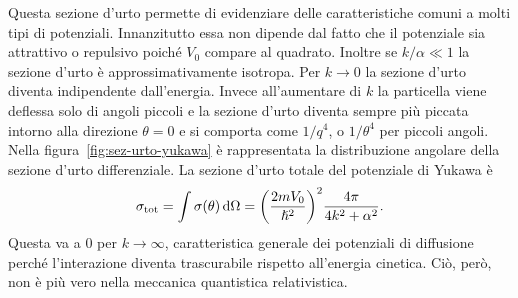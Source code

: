 \documentclass[a4paper,fleqn,twoside,12pt]{article}
\newcommand*{\dd}{\mathop{}\!\mathrm{d}} %
\begin{document}
Questa sezione d'urto permette di evidenziare delle caratteristiche comuni a
molti tipi di potenziali.  Innanzitutto essa non dipende dal fatto che il
potenziale sia attrattivo o repulsivo poiché $V_{0}$ compare al quadrato.
Inoltre se $k/\alpha \ll 1$ la sezione d'urto è approssimativamente isotropa.
Per $k \to 0$ la sezione d'urto diventa indipendente dall'energia.  Invece
all'aumentare di $k$ la particella viene deflessa solo di angoli piccoli e la
sezione d'urto diventa sempre più piccata intorno alla direzione $\theta = 0$ e
si comporta come $1/q^{4}$, o $1/\theta^{4}$ per piccoli angoli.  Nella
figura~\ref{fig:sez-urto-yukawa} è rappresentata la distribuzione angolare della
sezione d'urto differenziale.  La sezione d'urto totale del potenziale di Yukawa
è
\begin{equation}
  \sigma_{\textup{tot}} = \int \sigma(\theta) \dd\Omega =
  \bigg(\frac{2mV_{0}}{\hslash^{2}}\bigg)^{2} \frac{4\pi}{4k^{2} + \alpha^{2}}.
\end{equation}
Questa va a $0$ per $k \to \infty$, caratteristica generale dei potenziali di
diffusione perché l'interazione diventa trascurabile rispetto all'energia
cinetica.  Ciò, però, non è più vero nella meccanica quantistica relativistica.
\end{document}

